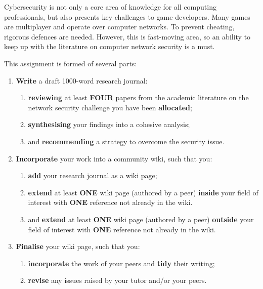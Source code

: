 \documentclass{../../fal_assignment}
\begin{document}
Cybersecurity  is not only a core area of knowledge for all computing professionals, 
but also presents key challenges to game developers. Many games are multiplayer and operate over
computer networks. To prevent cheating, rigorous defences are needed. However, this is fast-moving area, so an ability to keep up with the literature on
computer network security is a must.

This assignment is formed of several parts:

\begin{enumerate}[label=(\Alph*)]
    \item \textbf{Write} a draft 1000-word research journal:
    	\begin{enumerate}[label=(\roman*)]
    		\item \textbf{reviewing} at least \textbf{FOUR} papers from the academic literature on the network security challenge you have been \textbf{allocated};
    		\item \textbf{synthesising} your findings into a cohesive analysis;
    		\item and \textbf{recommending} a strategy to overcome the security issue.
    	\end{enumerate}
    \item \textbf{Incorporate} your work into a community wiki, such that you:
    	\begin{enumerate}[label=(\roman*)]
    		\item \textbf{add} your research journal as a wiki page;
    		\item \textbf{extend} at least \textbf{ONE} wiki page (authored by a peer) \textbf{inside} your field of interest with \textbf{ONE} reference not already in the wiki.
    		\item and \textbf{extend} at least \textbf{ONE} wiki page (authored by a peer) \textbf{outside} your field of interest with \textbf{ONE} reference not already in the wiki.
    	\end{enumerate}
    \item \textbf{Finalise} your wiki page, such that you:
    	\begin{enumerate}[label=(\roman*)]
    		\item \textbf{incorporate} the work of your peers and \textbf{tidy} their writing;
    		\item \textbf{revise} any issues raised by your tutor and/or your peers.
    	\end{enumerate}
\end{enumerate}
\end{document}
